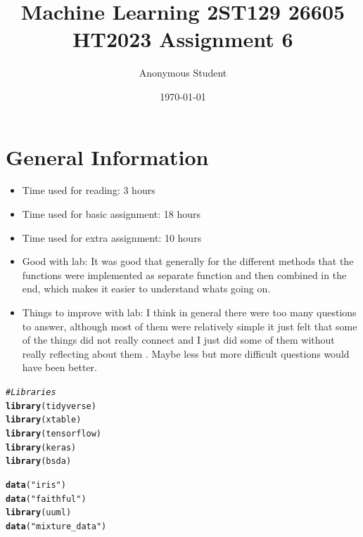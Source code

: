 \documentclass[10pt, a4paper, english]{article}\usepackage[]{graphicx}\usepackage[dvipsnames]{xcolor}
\title{Machine Learning 2ST129 26605 HT2023
 Assignment 6}
\author{Anonymous Student}
\date{\today}
\makeatletter
\newcommand{\hlstr}[1]{\textcolor[rgb]{0.192,0.494,0.8}{#1}}%
\newcommand{\hlcom}[1]{\textcolor[rgb]{0.678,0.584,0.686}{\textit{#1}}}%
\newcommand{\hlstd}[1]{\textcolor[rgb]{0.345,0.345,0.345}{#1}}%
\newcommand{\hlkwd}[1]{\textcolor[rgb]{0.737,0.353,0.396}{\textbf{#1}}}%
\newenvironment{kframe}{%
 \def\at@end@of@kframe{}%
 \ifinner\ifhmode%
  \def\at@end@of@kframe{\end{minipage}}%
  \begin{minipage}{\columnwidth}%
 \fi\fi%
 \def\FrameCommand##1{\hskip\@totalleftmargin \hskip-\fboxsep
 \colorbox{shadecolor}{##1}\hskip-\fboxsep
     \hskip-\linewidth \hskip-\@totalleftmargin \hskip\columnwidth}%
 \MakeFramed {\advance\hsize-\width
   \@totalleftmargin\z@ \linewidth\hsize
   \@setminipage}}%
 {\par\unskip\endMakeFramed%
 \at@end@of@kframe}
\newenvironment{knitrout}{}{} %
\makeatother
\begin{document}
\maketitle
\newpage
\tableofcontents
\newpage

\section*{General Information}
\begin{itemize}
\item Time used for reading: 3 hours 
\item Time used for basic assignment: 18 hours
\item Time used for extra assignment: 10 hours
\item Good with lab: It was good that generally for the different methods that the functions were implemented as separate function and then combined in the end, which makes it easier to understand whats going on. 
\item Things to improve with lab: I think in general there were too many questions to answer, although most of them were relatively simple it just felt that some of the things did not really connect and I just did some of them without really reflecting about them . Maybe less but more difficult questions would have been better. 
\end{itemize}
\newpage




\begin{knitrout}
\color{fgcolor}\begin{kframe}
\begin{alltt}
\hlcom{#Libraries}
 \hlkwd{library}\hlstd{(tidyverse)}
 \hlkwd{library}\hlstd{(xtable)}
 \hlkwd{library}\hlstd{(tensorflow)}
 \hlkwd{library}\hlstd{(keras)}
 \hlkwd{library}\hlstd{(bsda)}
\end{alltt}
\end{kframe}
\end{knitrout}

\begin{knitrout}
\color{fgcolor}\begin{kframe}
\begin{alltt}
\hlkwd{data}\hlstd{(}\hlstr{"iris"}\hlstd{)}
\hlkwd{data}\hlstd{(}\hlstr{"faithful"}\hlstd{)}
\hlkwd{library}\hlstd{(uuml)}
\hlkwd{data}\hlstd{(}\hlstr{"mixture_data"}\hlstd{)}
\end{alltt}
\end{kframe}
\end{knitrout}
\end{document}
